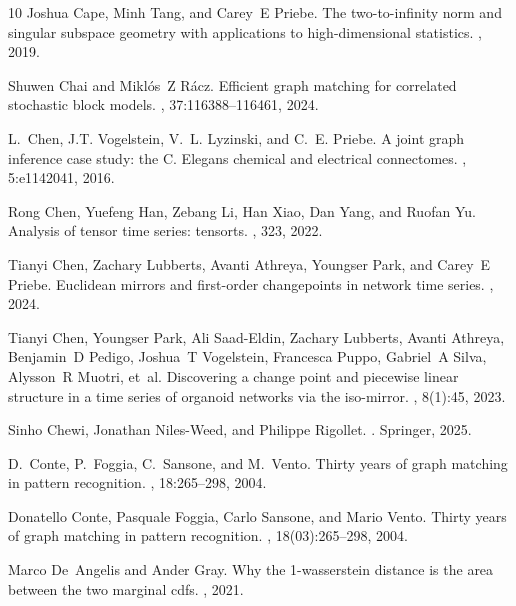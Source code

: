 \documentclass[12pt]{article}
\theoremstyle{definition}
\begin{document}
\begin{thebibliography}{10}
Joshua Cape, Minh Tang, and Carey~E Priebe.
\newblock The two-to-infinity norm and singular subspace geometry with applications to high-dimensional statistics.
, 2019.

Shuwen Chai and Mikl{\'o}s~Z R{\'a}cz.
\newblock Efficient graph matching for correlated stochastic block models.
, 37:116388--116461, 2024.

L.~Chen, J.T. Vogelstein, V.~L. Lyzinski, and C.~E. Priebe.
\newblock A joint graph inference case study: the {C. Elegans} chemical and electrical connectomes.
, 5:e1142041, 2016.

Rong Chen, Yuefeng Han, Zebang Li, Han Xiao, Dan Yang, and Ruofan Yu.
\newblock Analysis of tensor time series: tensorts.
, 323, 2022.

Tianyi Chen, Zachary Lubberts, Avanti Athreya, Youngser Park, and Carey~E Priebe.
\newblock Euclidean mirrors and first-order changepoints in network time series.
, 2024.

Tianyi Chen, Youngser Park, Ali Saad-Eldin, Zachary Lubberts, Avanti Athreya, Benjamin~D Pedigo, Joshua~T Vogelstein, Francesca Puppo, Gabriel~A Silva, Alysson~R Muotri, et~al.
\newblock Discovering a change point and piecewise linear structure in a time series of organoid networks via the iso-mirror.
, 8(1):45, 2023.

Sinho Chewi, Jonathan Niles-Weed, and Philippe Rigollet.
.
\newblock Springer, 2025.

D.~Conte, P.~Foggia, C.~Sansone, and M.~Vento.
\newblock Thirty years of graph matching in pattern recognition.
, 18:265--298, 2004.

Donatello Conte, Pasquale Foggia, Carlo Sansone, and Mario Vento.
\newblock Thirty years of graph matching in pattern recognition.
, 18(03):265--298, 2004.

Marco De~Angelis and Ander Gray.
\newblock Why the 1-wasserstein distance is the area between the two marginal cdfs.
, 2021.


\end{thebibliography}
\end{document}
